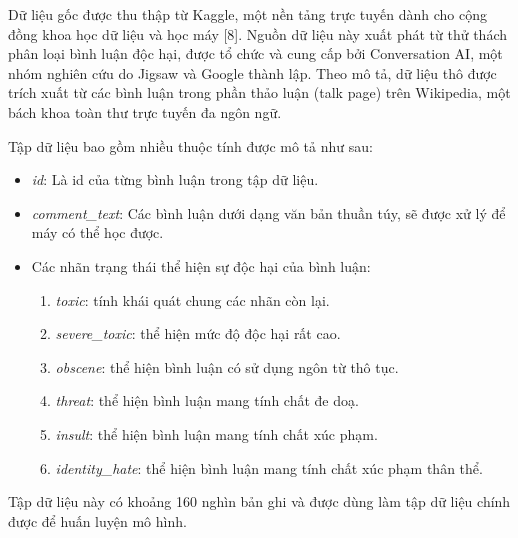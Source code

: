 Dữ liệu gốc được thu thập từ Kaggle, một nền tảng trực tuyến dành cho cộng đồng khoa học dữ liệu và học máy [8]. Nguồn dữ liệu này xuất phát từ thử thách phân loại bình luận độc hại, được tổ chức và cung cấp bởi Conversation AI, một nhóm nghiên cứu do Jigsaw và Google thành lập. Theo mô tả, dữ liệu thô được trích xuất từ các bình luận trong phần thảo luận (talk page) trên Wikipedia, một bách khoa toàn thư trực tuyến đa ngôn ngữ.

Tập dữ liệu bao gồm nhiều thuộc tính được mô tả như sau:
\begin{itemize}
    \item \textit{id}: Là id của từng bình luận trong tập dữ liệu.
    \item \textit{comment\_text}: Các bình luận dưới dạng văn bản thuần túy, sẽ được xử lý để máy có thể học được.
    \item Các nhãn trạng thái thể hiện sự độc hại của bình luận:
          \begin{enumerate}
              \item \textit{toxic}: tính khái quát chung các nhãn còn lại.
              \item \textit{severe\_toxic}: thể hiện mức độ độc hại rất cao.
              \item \textit{obscene}: thể hiện bình luận có sử dụng ngôn từ thô tục.
              \item \textit{threat}: thể hiện bình luận mang tính chất đe doạ.
              \item \textit{insult}: thể hiện bình luận mang tính chất xúc phạm.
              \item \textit{identity\_hate}: thể hiện bình luận mang tính chất xúc phạm thân thể.
          \end{enumerate}
\end{itemize}

Tập dữ liệu này có khoảng 160 nghìn bản ghi và được dùng làm tập dữ liệu chính được để huấn luyện mô hình.

